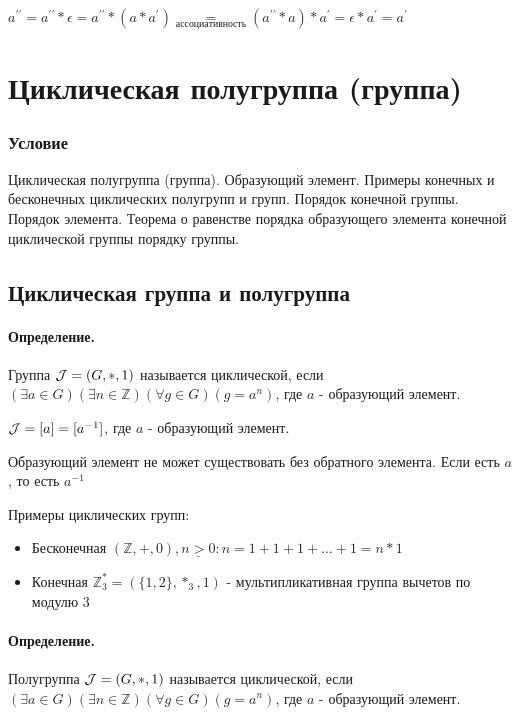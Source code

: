 \documentclass{report}
\begin{document}
$a^{\prime\prime} = a^{\prime\prime} * \epsilon =
	a^{\prime\prime} * (a * a^{\prime}) \underset{ассоциативность}{=}
	(a^{\prime\prime} * a) * a^{\prime} = \epsilon * a^{\prime} = a^{\prime}$

\newpage

\section{Циклическая полугруппа (группа)}
\subsubsection{Условие}
Циклическая полугруппа (группа). Образующий элемент. Примеры конечных и
бесконечных циклических полугрупп и групп. Порядок конечной группы. Порядок
элемента. Теорема о равенстве порядка образующего элемента конечной циклической
группы порядку группы.

\subsection{Циклическая группа и полугруппа}
\paragraph*{Определение.} Группа ${\cal J} = (G, *, 1)$ называется циклической,
если $(\exists a \in G)(\exists n \in \mathbb{Z})(\forall g \in G)(g = a^{n})$, где $a$ - образующий элемент.


${\cal J} = [a] = [a^{-1}]$, где $a$ - образующий элемент.


Образующий элемент не может существовать без обратного элемента. Если есть $a$, то есть $a^{-1}$

\medskip

Примеры циклических групп:
\begin{itemize}
	\item Бесконечная\newline
	      $(\mathbb{Z}, +, 0), \underline{n > 0}: n = 1 + 1 + 1 + \ldots + 1 = n * 1$
	\item Конечная\newline
	      $\mathbb{Z}^{*}_3 = (\{1,2\}, *_{3}, 1)$ - мультипликативная группа вычетов по модулю 3
\end{itemize}

\paragraph*{Определение.} Полугруппа ${\cal J} = (G, *, 1)$ называется циклической,
если $(\exists a \in G)(\exists n \in \mathbb{Z})(\forall g \in G)(g = a^{n})$, где $a$ - образующий элемент.
\end{document}
